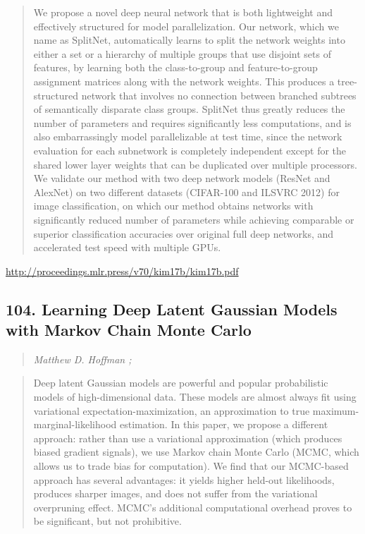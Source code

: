 \documentclass{article}
\begin{document}
\begin{quote}
    We propose a novel deep neural network that is both lightweight and effectively structured for model parallelization. Our network, which we name as SplitNet, automatically learns to split the network weights into either a set or a hierarchy of multiple groups that use disjoint sets of features, by learning both the class-to-group and feature-to-group assignment matrices along with the network weights. This produces a tree-structured network that involves no connection between branched subtrees of semantically disparate class groups. SplitNet thus greatly reduces the number of parameters and requires significantly less computations, and is also embarrassingly model parallelizable at test time, since the network evaluation for each subnetwork is completely independent except for the shared lower layer weights that can be duplicated over multiple processors. We validate our method with two deep network models (ResNet and AlexNet) on two different datasets (CIFAR-100 and ILSVRC 2012) for image classification, on which our method obtains networks with significantly reduced number of parameters while achieving comparable or superior classification accuracies over original full deep networks, and accelerated test speed with multiple GPUs.  
\end{quote}

\href{http://proceedings.mlr.press/v70/kim17b/kim17b.pdf}{http://proceedings.mlr.press/v70/kim17b/kim17b.pdf}

\subsection{104. Learning Deep Latent Gaussian Models with Markov Chain Monte Carlo}

\begin{quote}
\footnotesize{\textit{Matthew D. Hoffman ;}}

\end{quote}

\begin{quote}
    Deep latent Gaussian models are powerful and popular probabilistic models of high-dimensional data. These models are almost always fit using variational expectation-maximization, an approximation to true maximum-marginal-likelihood estimation. In this paper, we propose a different approach: rather than use a variational approximation (which produces biased gradient signals), we use Markov chain Monte Carlo (MCMC, which allows us to trade bias for computation). We find that our MCMC-based approach has several advantages: it yields higher held-out likelihoods, produces sharper images, and does not suffer from the variational overpruning effect. MCMC’s additional computational overhead proves to be significant, but not prohibitive.  
\end{quote}
\end{document}
